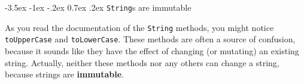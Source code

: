 \documentclass{book}
\makeatletter
\renewcommand{\section}{\@startsection 
    {section} {1} {0mm}%
    {-3.5ex \@plus -1ex \@minus -.2ex}%
    {0.7ex \@plus.2ex}%
    {\normalfont\Large\bfseries}}
\makeatother
\begin{document}




%



\section{{\tt String}s are immutable}
\label{immutable}

As you read the documentation of the {\tt String} methods, you
might notice {\tt toUpperCase} and {\tt toLowerCase}.  These
methods are often a source of confusion, because it sounds
like they have the effect of changing (or mutating) an
existing string.  Actually, neither these methods nor any
others can change a string, because strings are {\bf immutable}.
\end{document}
